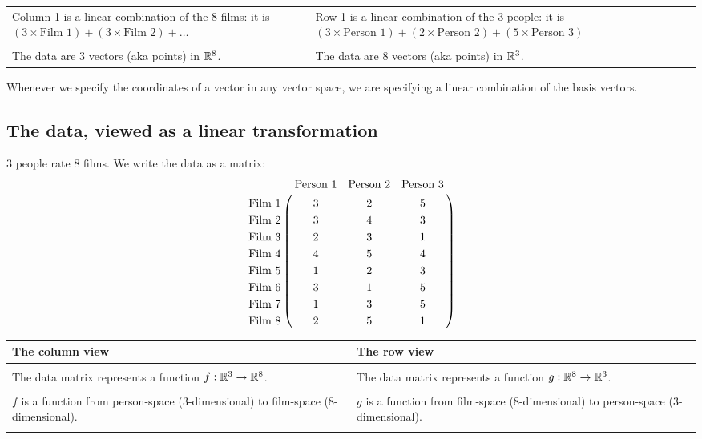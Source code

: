 \begin{lemma}
{\begin{tabular}{|p{8cm}|p{8 cm}|}
  Column 1 is a linear combination of the 8 films: it is
  $(3 \times \text{Film 1}) + (3 \times \text{Film 2}) + \ldots$
  &Row 1 is a linear combination of the 3 people: it is
    $(3 \times \text{Person 1}) + (2 \times \text{Person 2}) + (5 \times \text{Person 3})$\\
  &\\

  The data are 3 vectors (aka points) in $\mathbb{R}^8$.
  &The data are 8 vectors (aka points) in $\mathbb{R}^3$.
\end{tabular}

Whenever we specify the coordinates of a vector in any vector space, we are specifying a linear
combination of the basis vectors.

\newpage
\subsection*{The data, viewed as a linear transformation}

3 people rate 8 films. We write the data as a matrix:
\begin{align*}
\bordermatrix{
                &\text{Person 1} & \text{Person 2} &\text{Person 3} \cr
  \text{Film 1} &3               &  2              &  5             \cr
  \text{Film 2} &3               &  4              &  3             \cr
  \text{Film 3} &2               &  3              &  1             \cr
  \text{Film 4} &4               &  5              &  4             \cr
  \text{Film 5} &1               &  2              &  3             \cr
  \text{Film 6} &3               &  1              &  5             \cr
  \text{Film 7} &1               &  3              &  5             \cr
  \text{Film 8} &2               &  5              &  1             \cr
}
\end{align*}
\begin{tabular}{|p{8cm}|p{8 cm}|}
  {\bf The column view}
  &{\bf The row view}\\

  \hline
  &\\
  The data matrix represents a function $f: \mathbb{R}^3 \to \mathbb{R}^8$.
  &The data matrix represents a function $g: \mathbb{R}^8 \to \mathbb{R}^3$.\\
  &\\

  $f$ is a function from person-space (3-dimensional) to film-space (8-dimensional).
  &$g$ is a function from film-space (8-dimensional) to person-space (3-dimensional).\\
  &\\


\end{tabular}}
\end{lemma}
